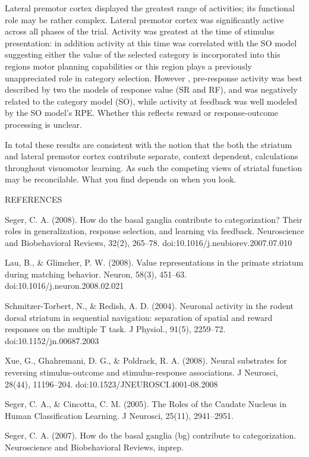 Lateral premotor cortex displayed the greatest range of activities; its functional role may be rather complex.  Lateral premotor cortex was significantly active across all phases of the trial.  Activity was greatest at the time of stimulus presentation: in addition activity at this time was correlated with the SO model suggesting either the value of the selected category is incorporated into this regions motor planning capabilities or this region plays a previously unappreciated role in category selection.  However , pre-response activity was best described by two the models of response value (SR and RF), and was negatively related to the category model (SO), while activity at feedback was well modeled by the SO model’s RPE.   Whether this reflects reward or response-outcome processing is unclear.

In total these results are consistent with the notion that the both the striatum and lateral premotor cortex contribute separate, context dependent, calculations throughout visuomotor learning.   As such the competing views of striatal function may be reconcilable. What you find depends on when you look.  



REFERENCES

Seger, C. A. (2008). How do the basal ganglia contribute to categorization? Their roles in generalization, response selection, and learning via feedback. Neuroscience and Biobehavioral Reviews, 32(2), 265–78. doi:10.1016/j.neubiorev.2007.07.010

Lau, B., & Glimcher, P. W. (2008). Value representations in the primate striatum during matching behavior. Neuron, 58(3), 451–63. doi:10.1016/j.neuron.2008.02.021

Schmitzer-Torbert, N., & Redish, A. D. (2004). Neuronal activity in the rodent dorsal striatum in sequential navigation: separation of spatial and reward responses on the multiple T task. J Physiol., 91(5), 2259–72. doi:10.1152/jn.00687.2003

Xue, G., Ghahremani, D. G., & Poldrack, R. A. (2008). Neural substrates for reversing stimulus-outcome and stimulus-response associations. J Neurosci, 28(44), 11196–204. doi:10.1523/JNEUROSCI.4001-08.2008

Seger, C. A., & Cincotta, C. M. (2005). The Roles of the Caudate Nucleus in Human Classification Learning. J Neurosci, 25(11), 2941–2951.

Seger, C. A. (2007). How do the basal ganglia (bg) contribute to categorization. Neuroscience and Biobehavioral Reviews, inprep.

